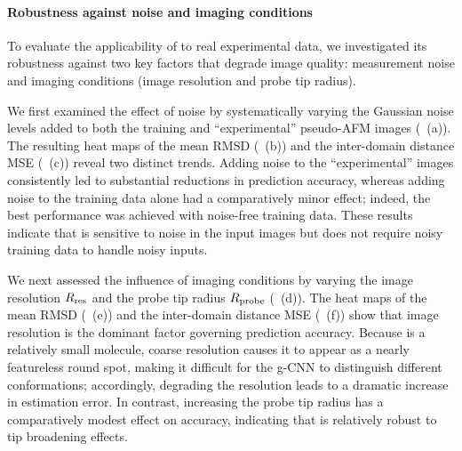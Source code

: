 \paragraph{Robustness against noise and imaging conditions}
To evaluate the applicability of \Model to real experimental data, 
we investigated its robustness against two key factors that degrade image quality: 
measurement noise and imaging conditions (image resolution and probe tip radius).

We first examined the effect of noise by systematically varying the Gaussian noise levels added to both the training and ``experimental'' pseudo-AFM images (~(a)).
The resulting heat maps of the mean RMSD (~(b)) and the inter-domain distance MSE (~(c)) reveal two distinct trends.
Adding noise to the ``experimental'' images consistently led to substantial reductions in prediction accuracy, whereas adding noise to the training data alone had a comparatively minor effect; 
indeed, the best performance was achieved with noise-free training data.
These results indicate that \Model is sensitive to noise in the input images but does not require noisy training data to handle noisy inputs.

We next assessed the influence of imaging conditions by varying the image resolution $R_{\rm res}$ and the probe tip radius $R_{\rm probe}$ (~(d)).
The heat maps of the mean RMSD (~(e)) and the inter-domain distance MSE (~(f)) show that image resolution is the dominant factor governing prediction accuracy.
Because \AK is a relatively small molecule, coarse resolution causes it to appear as a nearly featureless round spot, making it difficult for the g-CNN to distinguish different conformations; 
accordingly, degrading the resolution leads to a dramatic increase in estimation error.
In contrast, increasing the probe tip radius has a comparatively modest effect on accuracy, 
indicating that \Model is relatively robust to tip broadening effects.

